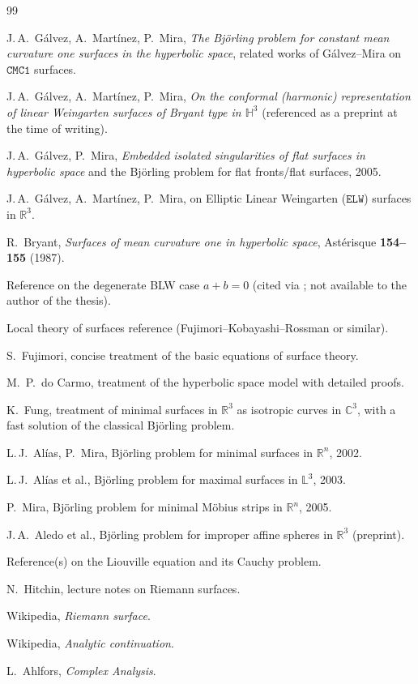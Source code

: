 \documentclass[11pt,a4paper]{article}
\newcommand{\RR}{\mathbb{R}}
\newcommand{\CC}{\mathbb{C}}
\newcommand{\Hyp}{\mathbb{H}^3}                      %
\theoremstyle{plain}
\theoremstyle{definition}
\theoremstyle{remark}
\begin{document}
\begin{thebibliography}{99}\small

 J.\,A.\ Gálvez, A.\ Martínez, P.\ Mira, \emph{The Björling
  problem for constant mean curvature one surfaces in the hyperbolic
  space}, related works of Gálvez--Mira on $\mathtt{CMC1}$ surfaces.

 J.\,A.\ Gálvez, A.\ Martínez, P.\ Mira, \emph{On the
  conformal (harmonic) representation of linear Weingarten surfaces of
  Bryant type in $\Hyp$} (referenced as a preprint at the time of
  writing).

 J.\,A.\ Gálvez, P.\ Mira, \emph{Embedded isolated
  singularities of flat surfaces in hyperbolic space} and the Björling
  problem for flat fronts/flat surfaces, 2005.

 J.\,A.\ Gálvez, A.\ Martínez, P.\ Mira, on Elliptic Linear
  Weingarten ($\mathtt{ELW}$) surfaces in $\RR^3$.

 R.\ Bryant, \emph{Surfaces of mean curvature one in
  hyperbolic space}, Astérisque \textbf{154--155} (1987).

 Reference on the degenerate BLW case $a+b=0$ (cited via
  \cite{GMM2}; not available to the author of the thesis).

 Local theory of surfaces reference (Fujimori--Kobayashi--Rossman
  or similar).

 S.\ Fujimori, concise treatment of the basic equations
  of surface theory.

 M.\ P.\ do Carmo, treatment of the hyperbolic space model
  with detailed proofs.

 K.\ Fung, treatment of minimal surfaces in $\RR^3$ as
  isotropic curves in $\CC^3$, with a fast solution of the classical
  Björling problem.

 L.\,J.\ Alías, P.\ Mira, Björling problem for minimal
  surfaces in $\RR^n$, 2002.

 L.\,J.\ Alías et al., Björling problem for maximal surfaces
  in $\mathbb L^3$, 2003.

 P.\ Mira, Björling problem for minimal Möbius strips in
  $\RR^n$, 2005.

 J.\,A.\ Aledo et al., Björling problem for improper affine
  spheres in $\RR^3$ (preprint).

 Reference(s) on the Liouville equation and its Cauchy
  problem.

 N.\ Hitchin, lecture notes on Riemann surfaces.

 Wikipedia, \emph{Riemann surface}.

 Wikipedia, \emph{Analytic continuation}.

 L.\ Ahlfors, \emph{Complex Analysis}.

\end{thebibliography}
\end{document}
